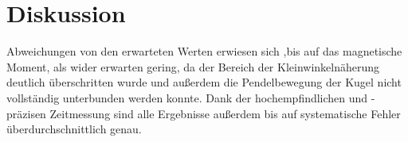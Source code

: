 \section{Diskussion}
\label{sec:Diskussion}

Abweichungen von den erwarteten Werten erwiesen sich ,bis auf das magnetische Moment, als wider erwarten gering,
da der Bereich der Kleinwinkelnäherung deutlich überschritten wurde und außerdem die Pendelbewegung der Kugel nicht vollständig unterbunden werden konnte.
Dank der hochempfindlichen und -präzisen Zeitmessung sind alle Ergebnisse außerdem bis auf systematische Fehler überdurchschnittlich genau.
